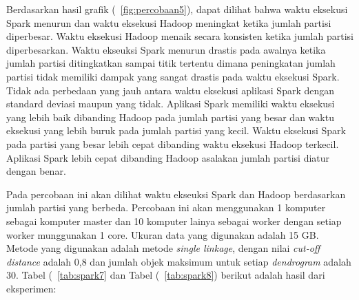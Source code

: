 Berdasarkan hasil grafik (~\ref{fig:percobaan5}), dapat dilihat bahwa waktu eksekusi Spark menurun dan waktu eksekusi Hadoop meningkat ketika jumlah partisi diperbesar. Waktu eksekusi Hadoop menaik secara konsisten ketika jumlah partisi diperbesarkan. Waktu ekseuksi Spark menurun drastis pada awalnya ketika jumlah partisi ditingkatkan sampai titik tertentu dimana peningkatan jumlah partisi tidak memiliki dampak yang sangat drastis pada waktu eksekusi Spark. Tidak ada perbedaan yang jauh antara waktu eksekusi aplikasi Spark dengan standard deviasi maupun yang tidak. Aplikasi Spark memiliki waktu eksekusi yang lebih baik dibanding Hadoop pada jumlah partisi yang besar dan waktu eksekusi yang lebih buruk pada jumlah partisi yang kecil. Waktu eksekusi Spark pada partisi yang besar lebih cepat dibanding waktu eksekusi Hadoop terkecil. Aplikasi Spark lebih cepat dibanding Hadoop asalakan jumlah partisi diatur dengan benar.






Pada percobaan ini akan dilihat waktu ekseuksi Spark dan Hadoop berdasarkan jumlah partisi yang berbeda. Percobaan ini akan menggunakan 1 komputer sebagai komputer master dan 10 komputer lainya sebagai worker dengan setiap worker munggunakan 1 core. Ukuran data yang digunakan adalah 15 GB. Metode yang digunakan adalah metode \textit{single linkage}, dengan nilai \textit{cut-off distance} adalah 0,8 dan jumlah objek maksimum untuk setiap \textit{dendrogram} adalah 30. Tabel (~\ref{tab:spark7} dan Tabel (~\ref{tab:spark8}) berikut adalah hasil dari eksperimen:

